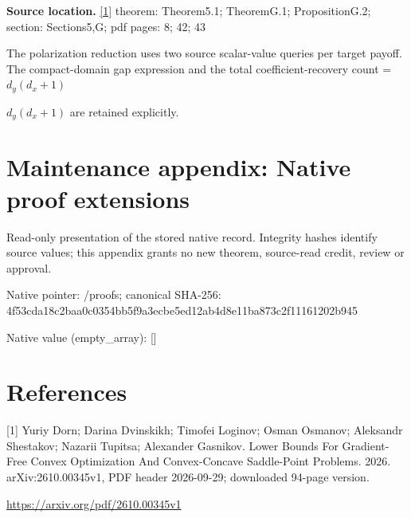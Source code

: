 \documentclass[10pt,a4paper]{article}
\newcommand{\AtlasMath}[1]{\par\begingroup\centering\setbox0=\hbox{$\displaystyle #1$}\ifdim\wd0>1.4\linewidth\typeout{ATLAS WIDE FORMULA: \the\wd0}\fi\ifdim\wd0>\linewidth\resizebox{\linewidth}{!}{\box0}\else\box0\fi\par\endgroup}
\newcommand{\AtlasInlineMath}[1]{\begingroup\setbox0=\hbox{$#1$}\ifdim\wd0>.4\linewidth\endgroup\AtlasMath{#1}\else\endgroup$#1$\fi}
\begin{document}
\textbf{Source location.} \href{https://arxiv.org/pdf/2610.00345v1}{[1]} theorem: Theorem5.1; TheoremG.1; PropositionG.2; section: Sections5,G; pdf pages: 8; 42; 43



The polarization reduction uses two source scalar-value queries per target payoff. The compact-domain gap expression and the total coefficient-recovery count \AtlasInlineMath{d_y(d_x+1)} are retained explicitly.



\section{Maintenance appendix: Native proof extensions}


Read-only presentation of the stored native record. Integrity hashes identify source values; this appendix grants no new theorem, source-read credit, review or approval.



Native pointer: /proofs; canonical SHA-256: 4f53cda18c2baa0c0354bb5f\allowbreak{}9a3ecbe5ed12ab4d8e11ba87\allowbreak{}3c2f11161202b945



Native value (empty\_array): []



\section{References}


[1] Yuriy Dorn; Darina Dvinskikh; Timofei Loginov; Osman Osmanov; Aleksandr Shestakov; Nazarii Tupitsa; Alexander Gasnikov. Lower Bounds For Gradient-Free Convex Optimization And Convex-Concave Saddle-Point Problems. 2026. arXiv:2610.00345v1, PDF header 2026-09-29; downloaded 94-page version.



\url{https://arxiv.org/pdf/2610.00345v1}
\end{document}
